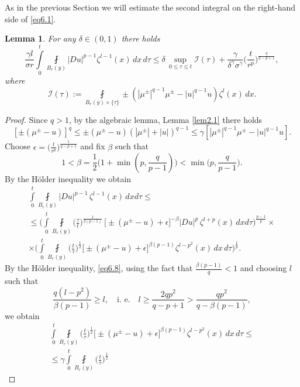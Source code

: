 \documentclass[a4paper,11pt,fullpage]{article}
\numberwithin{equation}{section}
\newtheorem{lemma}{Lemma}[section]
\begin{document}
As in the previous Section we will estimate the second integral on the right-hand side of \eqref{eq6.1}.
\begin{lemma}\label{lem6.2}
For any $\delta \in (0, 1)$ there holds
\begin{equation}\label{eq6.7}
\frac{\gamma l}{\sigma r}\int\limits^t_0\fint\limits_{B_{r}(y)}|D u|^{p-1} \zeta^{l-1}(x)\,dx\,d\tau\leqslant \delta\,\sup\limits_{0\leqslant \tau\leqslant t}\mathcal{I}(\tau)+\frac{\gamma}{\delta^\gamma \sigma^\gamma}
\Big(\frac{t}{r^p}\Big)^{\frac{q}{q-p+1}},
\end{equation}
where
$$\mathcal{I}(\tau):=\fint\limits_{B_{r}(y)\times\{\tau\}}\pm(|\mu^{\pm}|^{q-1}\mu^{\pm}-|u|^{q-1}u)\zeta^l(x)\,dx.$$
\end{lemma}
\begin{proof}
Since $q> 1$, by the algebraic lemma, Lemma \ref{lem2.1} there holds
\begin{equation}\label{eq6.8}
[\pm(\mu^{\pm}-u)]^q\leqslant \pm(\mu^{\pm}-u) (|\mu^{\pm}|+|u|)^{q-1}\leqslant \gamma [|\mu^{\pm}|^{q-1}\mu^{\pm}-|u|^{q-1}u].
\end{equation}
Choose  $\epsilon=\big(\frac{t}{r^p}\big)^{\frac{1}{q-p+1}}$ and fix $\beta$ such that
$$1<\beta=\frac{1}{2}\big(1+\min(p, \frac{q}{p-1})\big)<\min\big(p, \frac{q}{p-1}\big).$$
By the H\"{o}lder inequality we obtain
\begin{multline}\label{eq6.9}
\int\limits^t_0\fint\limits_{B_{r}(y)}|D u|^{p-1}\,\zeta^{l-1}(x)\,dx d\tau\leqslant\\\leqslant\Big(\int\limits^t_0\fint\limits_{B_{ r}(y)}\Big(\frac{\tau}{t}\Big)^{\frac{1}{2(p-1)}}\,\big[\pm(\mu^{\pm}-u)+\epsilon]^{-\beta}|D u|^{p}\,\zeta^{l+p}(x)\,dx d\tau\Big)^{\frac{p-1}{p}}\times\\\times\Big(
\int\limits^t_0\fint\limits_{B_{r}(y)}\Big(\frac{t}{\tau}\Big)^{\frac{1}{2}}
\big[\pm(\mu^{\pm}-u)+\epsilon\big]^{\beta(p-1)}\zeta^{l-p^2}(x)\,dx\,d\tau\Big)^{\frac{1}{p}}.
\end{multline}
By the H\"{o}lder inequality, \eqref{eq6.8}, using the fact that $\frac{\beta (p-1)}{q} <1$ and choosing $l$ such that
$$\frac{q(l-p^2)}{\beta (p-1)}\geqslant l,\quad \text{i. e.}\quad l\geqslant \frac{2 q p^2}{q-p+1}>\frac{q p^2}{q-\beta(p-1)},$$
we obtain
\begin{multline}\label{eq6.10}
\int\limits^t_0\fint\limits_{B_{r}(y)}\Big(\frac{t}{\tau}\Big)^{\frac{1}{2}}
\big[\pm(\mu^{\pm}-u)+\epsilon\big]^{\beta(p-1)}\zeta^{l-p^2}(x)\,dx\,d\tau\leqslant\\\leqslant
\gamma \int\limits^t_0\fint\limits_{B_{r}(y)}\Big(\frac{t}{\tau}\Big)^{\frac{1}{2}}

\end{multline}
\end{proof}
\end{document}
